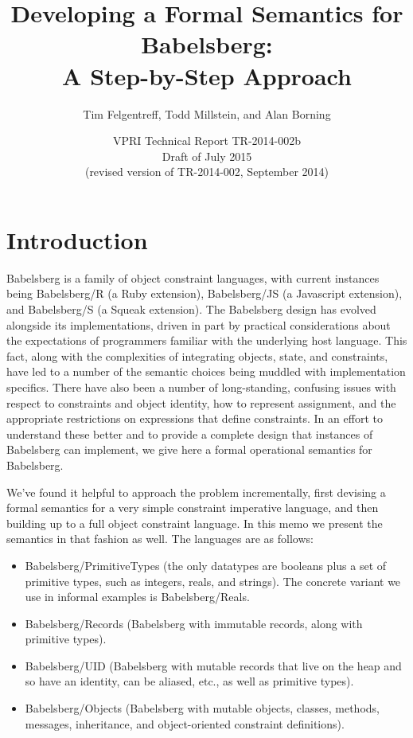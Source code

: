 \documentclass{article}
\newcounter{examples}
\begin{document}
\reversemarginpar

\title{Developing a Formal Semantics for Babelsberg: \\ 
  A Step-by-Step Approach}
\author{Tim Felgentreff, Todd Millstein, and Alan Borning}

\date{VPRI Technical Report TR-2014-002b \\
Draft of July 2015 \\
(revised version of TR-2014-002, September 2014)}

\maketitle

\section{Introduction}

Babelsberg \cite{felgentreff-babelsberg-tr} is a family of object
constraint languages, with current instances being Babelsberg/R (a
Ruby extension), Babelsberg/JS \cite{felgentreff-ecoop-2014} (a
Javascript extension), and Babelsberg/S (a Squeak extension). The
Babelsberg design has evolved alongside its implementations, driven in
part by practical considerations about the expectations of programmers
familiar with the underlying host language.  This fact, along with the
complexities of integrating objects, state, and constraints, have led
to a number of the semantic choices being muddled with implementation
specifics.  There have also been a number of long-standing, confusing
issues with respect to constraints and object identity, how to
represent assignment, and the appropriate restrictions on expressions
that define constraints.  In an effort to understand these better and
to provide a complete design that instances of Babelsberg can
implement, we give here a formal operational semantics for Babelsberg.

We've found it helpful to approach the problem incrementally, first
devising a formal semantics for a very simple constraint imperative
language, and then building up to a full object constraint language.
In this memo we present the semantics in that fashion as well.  The
languages are as follows:

\begin{itemize}

\item Babelsberg/PrimitiveTypes (the only datatypes are booleans plus
  a set of primitive types, such as integers, reals, and strings).
  The concrete variant we use in informal examples is Babelsberg/Reals.
\item Babelsberg/Records (Babelsberg with immutable records, along
  with primitive types).
\item Babelsberg/UID (Babelsberg with mutable records that live on the
  heap and so have an identity, can be aliased, etc., as well as
  primitive types).
\item Babelsberg/Objects (Babelsberg with mutable objects, classes,
  methods, messages, inheritance, and object-oriented constraint
  definitions).
\end{itemize}
\end{document}
